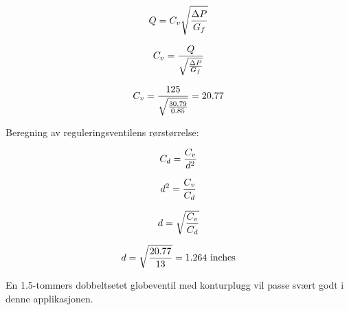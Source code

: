 $$Q = C_v \sqrt{\Delta P \over G_f}$$

$$C_v = {Q \over \sqrt{\Delta P \over G_f}}$$

$$C_v = {125 \over \sqrt{30.79 \over 0.85}} = 20.77$$

\vskip 10pt

Beregning av reguleringsventilens rørstørrelse:

$$C_d = {C_v \over d^2}$$

$$d^2 = {C_v \over C_d}$$

$$d = \sqrt{C_v \over C_d}$$

$$d = \sqrt{20.77 \over 13} = 1.264 \hbox{ inches}$$


\vskip 10pt

En 1.5-tommers dobbeltsetet globeventil med konturplugg vil passe svært godt i denne applikasjonen.



